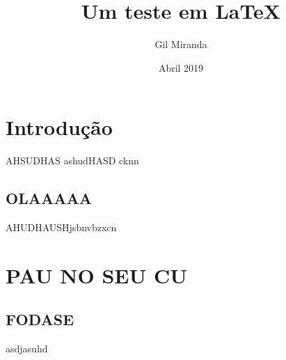\documentclass[12pt, a4paper]{report}
\title{Um teste em \LaTeX}
\author{Gil Miranda}
\date{Abril 2019}
\begin{document}
  \maketitle
  \tableofcontents
  \chapter{Introdução}
  AHSUDHAS
  ashudHASD
  cknn
  \section{OLAAAAA}
  AHUDHAUSHjsbnvbzxcn
  \newpage
  \chapter{PAU NO SEU CU}
  \section{FODASE}
  asdjasuhd
\end{document}
